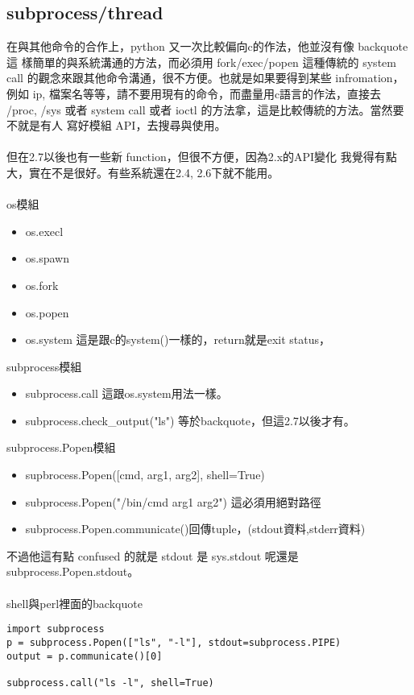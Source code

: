   \subsection{subprocess/thread}
  在與其他命令的合作上，python 又一次比較偏向c的作法，他並沒有像 backquote 這
  樣簡單的與系統溝通的方法，而必須用 fork/exec/popen 這種傳統的 system call 
  的觀念來跟其他命令溝通，很不方便。也就是如果要得到某些 infromation，例如 ip,
  檔案名等等，請不要用現有的命令，而盡量用c語言的作法，直接去 /proc, /sys 
  或者 system call 或者 ioctl 的方法拿，這是比較傳統的方法。當然要不就是有人
  寫好模組 API，去搜尋與使用。
  \\\\
  但在2.7以後也有一些新 function，但很不方便，因為2.x的API變化
  我覺得有點大，實在不是很好。有些系統還在2.4, 2.6下就不能用。
  \\\\
  os模組
\begin{itemize}
  \item os.execl
  \item os.spawn
  \item os.fork
  \item os.popen
  \item os.system 這是跟c的system()一樣的，return就是exit status，
\end{itemize}
  subprocess模組
\begin{itemize}
  \item subprocess.call 這跟os.system用法一樣。
  \item subprocess.check\_output("ls") 等於backquote，但這2.7以後才有。
\end{itemize}
  subprocess.Popen模組
\begin{itemize}
  \item supbrocess.Popen([cmd, arg1, arg2], shell=True)
  \item subprocess.Popen("/bin/cmd arg1 arg2") 這必須用絕對路徑
  \item subprocess.Popen.communicate()回傳tuple，(stdout資料,stderr資料)
\end{itemize}
  不過他這有點 confused 的就是 stdout 是 sys.stdout 呢還是 
  subprocess.Popen.stdout。
  \\\\
  shell與perl裡面的backquote
  \begin{verbatim}
import subprocess
p = subprocess.Popen(["ls", "-l"], stdout=subprocess.PIPE)
output = p.communicate()[0]

subprocess.call("ls -l", shell=True)
  \end{verbatim}
